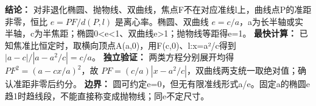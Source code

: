 \textbf{结论：} 对非退化椭圆、抛物线、双曲线，焦点F不在对应准线l上，曲线点P的准距非零，恒比 $e=PF/d(P,l)$ 是离心率。椭圆、双曲线 $e=c/a$，a为长半轴或实半轴，c为半焦距；椭圆0<e<1、双曲线e>1；抛物线等距得e=1。
\textbf{最快计算：} 已知焦准比恒定时，取横向顶点A(a,0)，用F(c,0)、l:x=a²/c得到 $|a-c|/|a-a^2/c|=c/a$。
\textbf{独立验证：} 两类方程分别展开均得 $PF^2=(a-cx/a)^2$，故 $PF=(c/a)|x-a^2/c|$，双曲线两支统一取绝对值；确认准距非零后约分。
\textbf{边界：} 圆可约定e=0，但无有限准线形式a/e。固定a的椭圆e趋1时趋线段，不能直接称变成抛物线；同e不定尺寸。
